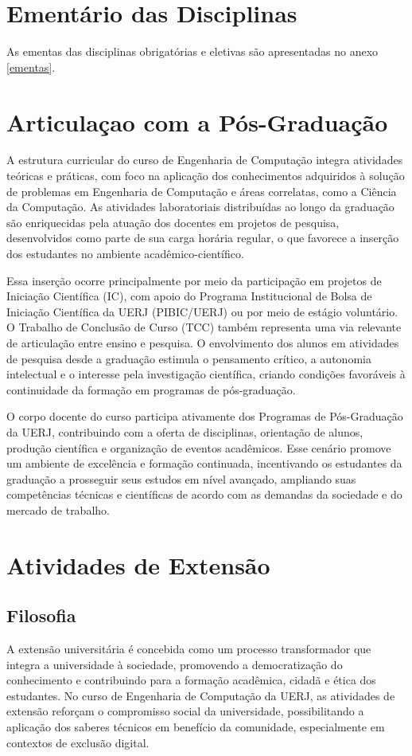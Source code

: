 \section{Ementário das Disciplinas}

As ementas das disciplinas obrigatórias e eletivas são apresentadas no anexo \ref{ementas}.

\section{Articulaçao com a Pós-Graduação }

A estrutura curricular do curso de Engenharia de Computação integra atividades teóricas e práticas, com foco na aplicação dos conhecimentos adquiridos à solução de problemas em Engenharia de Computação e áreas correlatas, como a Ciência da Computação. As atividades laboratoriais distribuídas ao longo da graduação são enriquecidas pela atuação dos docentes em projetos de pesquisa, desenvolvidos como parte de sua carga horária regular, o que favorece a inserção dos estudantes no ambiente acadêmico-científico.

Essa inserção ocorre principalmente por meio da participação em projetos de Iniciação Científica (IC), com apoio do Programa Institucional de Bolsa de Iniciação Científica da UERJ (PIBIC/UERJ) ou por meio de estágio voluntário. O Trabalho de Conclusão de Curso (TCC) também representa uma via relevante de articulação entre ensino e pesquisa. O envolvimento dos alunos em atividades de pesquisa desde a graduação estimula o pensamento crítico, a autonomia intelectual e o interesse pela investigação científica, criando condições favoráveis à continuidade da formação em programas de pós-graduação.

O corpo docente do curso participa ativamente dos Programas de Pós-Graduação da UERJ, contribuindo com a oferta de disciplinas, orientação de alunos, produção científica e organização de eventos acadêmicos. Esse cenário promove um ambiente de excelência e formação continuada, incentivando os estudantes da graduação a prosseguir seus estudos em nível avançado, ampliando suas competências técnicas e científicas de acordo com as demandas da sociedade e do mercado de trabalho.

\section{Atividades de Extensão}

\subsection{Filosofia}
A extensão universitária é concebida como um processo transformador que integra a universidade à sociedade, promovendo a democratização do conhecimento e contribuindo para a formação acadêmica, cidadã e ética dos estudantes. No curso de Engenharia de Computação da UERJ, as atividades de extensão reforçam o compromisso social da universidade, possibilitando a aplicação dos saberes técnicos em benefício da comunidade, especialmente em contextos de exclusão digital.

